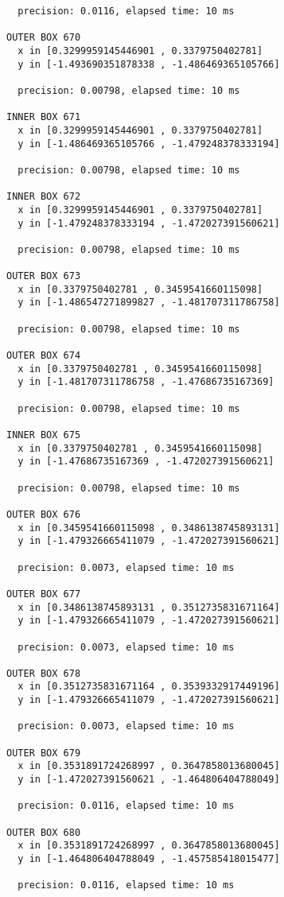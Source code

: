 \begin{verbatim}
  precision: 0.0116, elapsed time: 10 ms

OUTER BOX 670
  x in [0.3299959145446901 , 0.3379750402781]
  y in [-1.493690351878338 , -1.486469365105766]

  precision: 0.00798, elapsed time: 10 ms

INNER BOX 671
  x in [0.3299959145446901 , 0.3379750402781]
  y in [-1.486469365105766 , -1.479248378333194]

  precision: 0.00798, elapsed time: 10 ms

INNER BOX 672
  x in [0.3299959145446901 , 0.3379750402781]
  y in [-1.479248378333194 , -1.472027391560621]

  precision: 0.00798, elapsed time: 10 ms

OUTER BOX 673
  x in [0.3379750402781 , 0.3459541660115098]
  y in [-1.486547271899827 , -1.481707311786758]

  precision: 0.00798, elapsed time: 10 ms

OUTER BOX 674
  x in [0.3379750402781 , 0.3459541660115098]
  y in [-1.481707311786758 , -1.47686735167369]

  precision: 0.00798, elapsed time: 10 ms

INNER BOX 675
  x in [0.3379750402781 , 0.3459541660115098]
  y in [-1.47686735167369 , -1.472027391560621]

  precision: 0.00798, elapsed time: 10 ms

OUTER BOX 676
  x in [0.3459541660115098 , 0.3486138745893131]
  y in [-1.479326665411079 , -1.472027391560621]

  precision: 0.0073, elapsed time: 10 ms

OUTER BOX 677
  x in [0.3486138745893131 , 0.3512735831671164]
  y in [-1.479326665411079 , -1.472027391560621]

  precision: 0.0073, elapsed time: 10 ms

OUTER BOX 678
  x in [0.3512735831671164 , 0.3539332917449196]
  y in [-1.479326665411079 , -1.472027391560621]

  precision: 0.0073, elapsed time: 10 ms

OUTER BOX 679
  x in [0.3531891724268997 , 0.3647858013680045]
  y in [-1.472027391560621 , -1.464806404788049]

  precision: 0.0116, elapsed time: 10 ms

OUTER BOX 680
  x in [0.3531891724268997 , 0.3647858013680045]
  y in [-1.464806404788049 , -1.457585418015477]

  precision: 0.0116, elapsed time: 10 ms


\end{verbatim}
